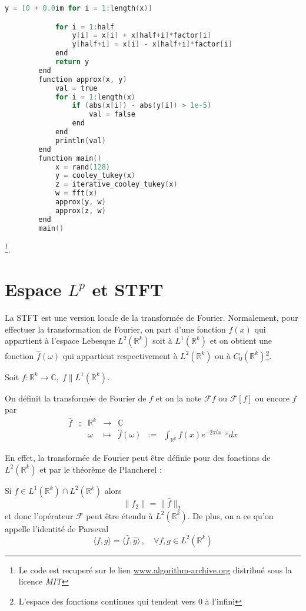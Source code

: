 \begin{lstlisting}[language=C, caption= Cooley-Tukey with Butterfly Diagrams ]
		    y = [0 + 0.0im for i = 1:length(x)]

		    for i = 1:half
		        y[i] = x[i] + x[half+i]*factor[i]
		        y[half+i] = x[i] - x[half+i]*factor[i]
		    end
		    return y
		end
		function approx(x, y)
		    val = true
		    for i = 1:length(x)
		        if (abs(x[i]) - abs(y[i]) > 1e-5)
		            val = false
		        end
		    end
		    println(val)
		end
		function main()
		    x = rand(128)
		    y = cooley_tukey(x)
		    z = iterative_cooley_tukey(x)
		    w = fft(x)
		    approx(y, w)
		    approx(z, w)
		end
		main()
	\end{lstlisting}\footnote{Le code est recuperé sur le lien \href{https://www.algorithm-archive.org/contents/cooley_tukey/cooley_tukey.html}{www.algorithm-archive.org} distribué sous la licence \textit{MIT}}.


	\section{Espace $L^p$ et STFT}

	La STFT est une version locale de la transformée de Fourier. Normalement, pour effectuer la transformation de Fourier, on part d'une fonction $f(x)$ qui appartient à l'espace Lebesque $L^{2} (\mathbb{R}^k)$ soit à $L^{1} (\mathbb{R}^k)$ et on obtient une fonction $\hat{f}(\omega)$ qui appartient respectivement à $L^{2} (\mathbb{R}^k)$ ou à $C_{0}(\mathbb{R}^{k})$\footnote{L'espace des fonctions continues qui tendent vers $0$ à l'infini}.

	Soit $f:\mathbb{R}^k \rightarrow \mathbb{C}, \; f \| L^1(\mathbb{R}^k)$.

	On définit la transformée de Fourier de $f$ et on la note $\mathcal{F}f$ ou $\mathcal{F}[f]$ ou encore $\hat{f}$ par
	$$
	\begin{matrix}
	\hat{f} & : & \mathbb{R}^k & \rightarrow & \mathbb{C}			 &    & \\
			&   & \omega & \mapsto     & \hat{f}(\omega) & := & \int_{\mathbb{R}^k}f(x)e^{-2 \pi i x \cdot \omega} dx
	\end{matrix}
	$$

	En effet, la transformée de Fourier peut être définie pour des fonctions de $L^2(\mathbb{R}^k)$ et par le théorème de Plancherel :

	Si $f \in L^1(\mathbb{R}^k) \cap L^2(\mathbb{R}^k)$ alors 
	$$\| {f}_{2} \| = \|\hat{f}\|_{2}$$
	et donc l'opérateur $\mathcal{F}$ peut être étendu à $L^2(\mathbb{R}^k)$. De plus, on a ce qu'on appelle l'identité de Parseval
	$$ \langle f, g \rangle = \langle \hat{f}, \hat{g} \rangle \, , \quad \forall f,g \in L^2(\mathbb{R}^k) $$

